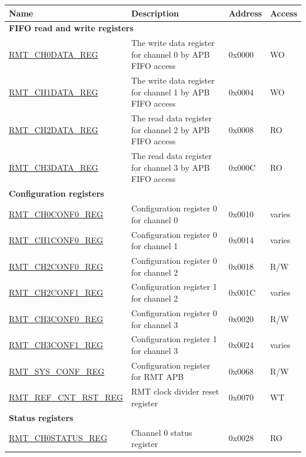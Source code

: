 \begin{longtable}{ | p{5.2cm} | p{7.2cm} | p{1.3cm} | p{1.8cm} | }
\hline\rowcolor{lightgray}
\textbf{Name} & \textbf{Description} &  \textbf{Address} & \textbf{Access} \\ \hline
\endhead
\multicolumn{4}{|l|}{\textbf{FIFO read and write registers}} \\ \hline
\hyperref[regdesc:RMTCHNDATAREG]{RMT\_CH0DATA\_REG} & The write data register for channel 0 by APB FIFO access & 0x0000 & WO \\ \hline
\hyperref[regdesc:RMTCHNDATAREG]{RMT\_CH1DATA\_REG} & The write data register for channel 1 by APB FIFO access & 0x0004 & WO \\ \hline
\hyperref[regdesc:RMTCHMDATAREG]{RMT\_CH2DATA\_REG} & The read data register for channel 2 by APB FIFO access & 0x0008 & RO \\ \hline
\hyperref[regdesc:RMTCHMDATAREG]{RMT\_CH3DATA\_REG} & The read data register for channel 3 by APB FIFO access & 0x000C & RO \\ \hline
\multicolumn{4}{|l|}{\textbf{Configuration registers}} \\ \hline
\hyperref[regdesc:RMTCHNCONF0REG]{RMT\_CH0CONF0\_REG} & Configuration register 0 for channel 0 & 0x0010 & varies \\ \hline
\hyperref[regdesc:RMTCHNCONF0REG]{RMT\_CH1CONF0\_REG} & Configuration register 0 for channel 1 & 0x0014 & varies \\ \hline
\hyperref[regdesc:RMTCHMCONF0REG]{RMT\_CH2CONF0\_REG} & Configuration register 0 for channel 2 & 0x0018 & R/W \\ \hline
\hyperref[regdesc:RMTCHMCONF1REG]{RMT\_CH2CONF1\_REG} & Configuration register 1 for channel 2 & 0x001C & varies \\ \hline
\hyperref[regdesc:RMTCHMCONF0REG]{RMT\_CH3CONF0\_REG} & Configuration register 0 for channel 3 & 0x0020 & R/W \\ \hline
\hyperref[regdesc:RMTCHMCONF1REG]{RMT\_CH3CONF1\_REG} & Configuration register 1 for channel 3 & 0x0024 & varies \\ \hline
\hyperref[regdesc:RMTSYSCONFREG]{RMT\_SYS\_CONF\_REG} & Configuration register for RMT APB & 0x0068 & R/W \\ \hline
\hyperref[regdesc:RMTREFCNTRSTREG]{RMT\_REF\_CNT\_RST\_REG} & RMT clock divider reset register & 0x0070 & WT \\ \hline
\multicolumn{4}{|l|}{\textbf{Status registers}} \\ \hline
\hyperref[regdesc:RMTCHNSTATUSREG]{RMT\_CH0STATUS\_REG} & Channel 0 status register & 0x0028 & RO \\ \hline

\end{longtable}
